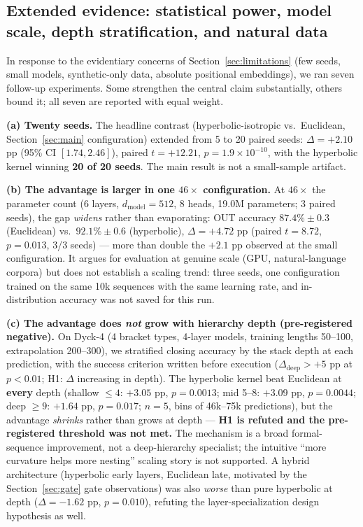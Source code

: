 \documentclass[11pt]{article}
\begin{document}
\subsection{Extended evidence: statistical power, model scale, depth stratification, and natural data}\label{sec:extended}

In response to the evidentiary concerns of Section~\ref{sec:limitations} (few seeds, small models, synthetic-only data, absolute positional embeddings), we ran seven follow-up experiments. Some strengthen the central claim substantially, others bound it; all seven are reported with equal weight.

\textbf{(a) Twenty seeds.} The headline contrast (hyperbolic-isotropic vs.\ Euclidean, Section~\ref{sec:main} configuration) extended from 5 to 20 paired seeds: $\Delta = +2.10$ pp (95\% CI $[1.74, 2.46]$), paired $t = +12.21$, $p = 1.9\times10^{-10}$, with the hyperbolic kernel winning \textbf{20 of 20 seeds}. The main result is not a small-sample artifact.

\textbf{(b) The advantage is larger in one $46\times$ configuration.} At $46\times$ the parameter count (6 layers, $d_{\mathrm{model}} = 512$, 8 heads, 19.0M parameters; 3 paired seeds), the gap \emph{widens} rather than evaporating: OUT accuracy $87.4\% \pm 0.3$ (Euclidean) vs.\ $92.1\% \pm 0.6$ (hyperbolic), $\Delta = +4.72$ pp (paired $t = 8.72$, $p = 0.013$, 3/3 seeds) --- more than double the $+2.1$ pp observed at the small configuration. It argues for evaluation at genuine scale (GPU, natural-language corpora) but does not establish a scaling trend: three seeds, one configuration trained on the same 10k sequences with the same learning rate, and in-distribution accuracy was not saved for this run.

\textbf{(c) The advantage does \emph{not} grow with hierarchy depth (pre-registered negative).} On Dyck-4 (4 bracket types, 4-layer models, training lengths 50--100, extrapolation 200--300), we stratified closing accuracy by the stack depth at each prediction, with the success criterion written before execution ($\Delta_{\mathrm{deep}} > +5$ pp at $p<0.01$; H1: $\Delta$ increasing in depth). The hyperbolic kernel beat Euclidean at \textbf{every} depth (shallow $\le 4$: $+3.05$ pp, $p=0.0013$; mid 5--8: $+3.09$ pp, $p=0.0044$; deep $\ge 9$: $+1.64$ pp, $p=0.017$; $n=5$, bins of 46k--75k predictions), but the advantage \emph{shrinks} rather than grows at depth --- \textbf{H1 is refuted and the pre-registered threshold was not met.} The mechanism is a broad formal-sequence improvement, not a deep-hierarchy specialist; the intuitive ``more curvature helps more nesting'' scaling story is not supported. A hybrid architecture (hyperbolic early layers, Euclidean late, motivated by the Section~\ref{sec:gate} gate observations) was also \emph{worse} than pure hyperbolic at depth ($\Delta = -1.62$ pp, $p = 0.010$), refuting the layer-specialization design hypothesis as well.
\end{document}
